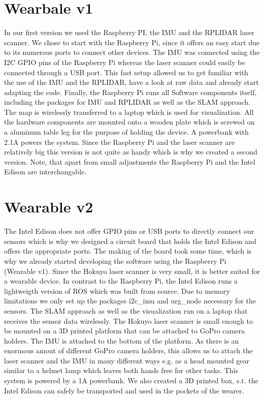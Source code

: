 \documentclass{sigchi-ext}
\begin{document}
\section{Wearbale v1}
In our first version we used the Raspberry PI, the IMU and the RPLIDAR laser scanner. We chose to start with the Raspberry Pi, since it offers an easy start due to its numerous ports to connect other devices. The IMU was connected using the I2C GPIO pins of the Raspberry Pi whereas the laser scanner could easily be connected through a USB port. This fast setup allowed us to get familiar with the use of the IMU and the RPLIDAR, have a look at raw data and already start adapting the code. Finally, the Raspberry Pi runs all Software components itself, including the packages for IMU and RPLIDAR as well as the SLAM approach. The map is wirelessly transferred to a laptop which is used for visualization. All the hardware components are mounted onto a wooden plate which is screwed on a aluminum table leg for the purpose of holding the device. A powerbank with 2.1A powers the system. Since the Raspberry Pi and the laser scanner are relatively big this version is not quite as handy which is why we created a second version. Note, that apart from small adjustments the Raspberry Pi and the Intel Edison are interchangable.

\section{Wearable v2}
The Intel Edison does not offer GPIO pins or USB ports to directly connect our sensors which is why we designed a circuit board that holds the Intel Edison and offers the appropriate ports. The making of the board took some time, which is why we already started developing the software using the Raspberry Pi (Wearable v1). Since the Hokuyo laser scanner is very small, it is better suited for a wearable device. In contrast to the Raspberry Pi, the Intel Edison runs a lightweigth version of ROS which was built from source. Due to memory limitations we only set up the packages i2c\_imu and urg\_node necessary for the sensors.
The SLAM approach as well as the visualization run on a laptop that receives the sensor data wirelessly. The Hokuyo laser scanner is small enough to be mounted on a 3D printed platform that can be attached to GoPro camera holders. The IMU is attached to the bottom of the platform. As there is an enormous amout of different GoPro camera holders, this allows us to attach the laser scanner and the IMU in many different ways e.g. as a head mounted gear similar to a helmet lamp which leaves both hands free for other tasks. This system is powered by a 1A powerbank. We also created a 3D printed box, s.t. the Intel Edison can safely be transported and used in the pockets of the wearer. 
\end{document}
